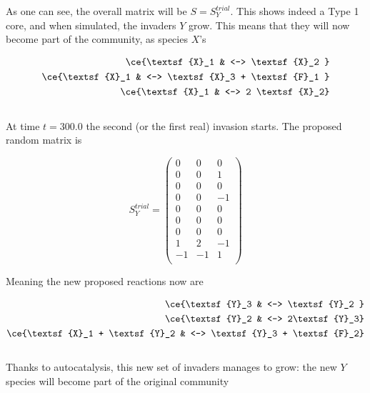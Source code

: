 \documentclass{article}
\begin{document}
As one can see, the overall matrix will be $S=S^{trial}_Y$. This shows indeed
a Type 1 core, and when simulated, the invaders $Y$ grow. This means that they will now become part of the community, as species $X$'s

\begin{equation}
		\begin{split}
\ce{\textsf{X}_1 & <--> \textsf{X}_2 }\\ 
\ce{\textsf{X}_1 & <--> \textsf{X}_3 + \textsf{F}_1 }\\ 
\ce{\textsf{X}_1 & <--> 2 \textsf{X}_2}\\ 
\end{split} 
\end{equation}
\\

At time $t=300.0$ the second (or the first real) invasion starts. The proposed random matrix is 

\begin{center}
\begin{equation}
    S^{trial}_Y = \begin{pmatrix}
0 & 0 & 0 \\
0 & 0 & 1 \\
0 & 0 & 0 \\
0 & 0 & -1 \\
0 & 0 & 0 \\
0 & 0 & 0 \\
0 & 0 & 0 \\
1 & 2 & -1 \\
-1 & -1 & 1 \\
\end{pmatrix}
\end{equation}
\end{center}

Meaning the new proposed reactions now are

\begin{equation}
		\begin{split}
\ce{\textsf{Y}_3 & <--> \textsf{Y}_2 }\\ 
\ce{\textsf{Y}_2 & <--> 2\textsf{Y}_3}\\ 
\ce{\textsf{X}_1 + \textsf{Y}_2 & <--> \textsf{Y}_3 + \textsf{F}_2}\\ 
\end{split} 
\end{equation}
\\

Thanks to autocatalysis, this new set of invaders manages to grow: the new $Y$ species will become part of the original community
\end{document}
